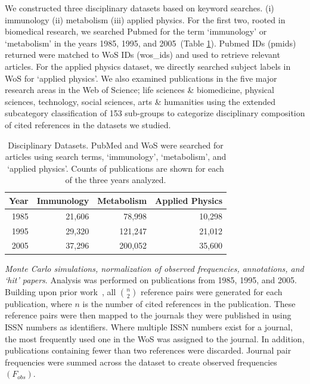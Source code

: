 \documentclass[NETN]{stjour}
\begin{document}
We constructed three disciplinary datasets based on keyword searches. (i) immunology (ii) metabolism (iii) applied physics. For the first two, rooted in biomedical research, we searched Pubmed for the term `immunology' or `metabolism' in the years 1985, 1995, and 2005~(Table \ref{tab:disc-datasets}). Pubmed IDs (pmids) returned were matched to WoS IDs (wos\_ids) and used to retrieve relevant articles. For the applied physics dataset, we directly searched subject labels in WoS for `applied physics'. We also examined publications in the five major research areas in the Web of Science; life sciences \& biomedicine, physical sciences, technology, social sciences, arts \& humanities using the extended subcategory classification of 153 sub-groups to categorize disciplinary composition of cited references in the datasets we studied.

\begin{table}[ht]
\caption{Disciplinary Datasets. PubMed and WoS were searched for articles using search terms, `immunology', `metabolism', and `applied physics'. Counts of publications are shown for each of the three years analyzed.}
\label{tab:disc-datasets}
\centering
\begin{tabular}{|r r r r|}
  \hline
Year & Immunology & Metabolism & Applied Physics \\ 
  \hline
1985 & 21,606 & 78,998 & 10,298 \\ 
1995 & 29,320 & 121,247 & 21,012  \\ 
2005 & 37,296 & 200,052 & 35,600  \\ 
 \hline
\end{tabular}
\end{table}

\emph{Monte Carlo simulations, normalization of observed frequencies, annotations, and `hit' papers}. Analysis was performed on publications from 1985, 1995, and 2005. Building upon prior work~\cite{uzzi_atypical_2013}, all ${n \choose 2}$ reference pairs were generated for each publication, where $n$ is the number of cited references in the publication. These reference pairs were then mapped to the journals they were published in using ISSN numbers as identifiers. Where multiple ISSN numbers exist for a journal, the most frequently used one in the WoS was assigned to the journal. In addition, publications containing fewer than two references were discarded. Journal pair frequencies were summed across the dataset to create observed frequencies $(F_{obs})$. 
\end{document}

